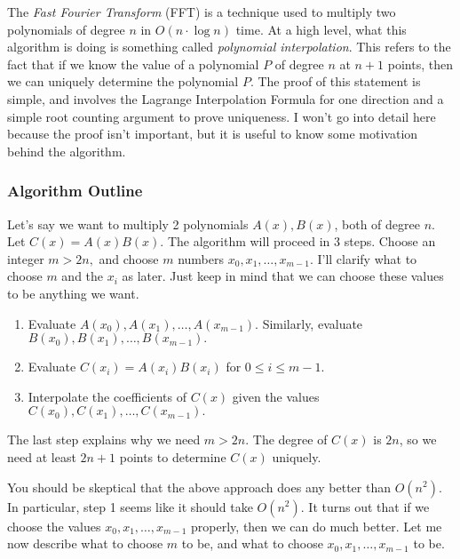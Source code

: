 The \emph{Fast Fourier Transform} (FFT) is a technique used to multiply two polynomials of degree $n$ in $O(n \cdot \log n)$ time. At a high level, what this algorithm is doing is something called \emph{polynomial interpolation}. This refers to the fact that if we know the value of a polynomial $P$ of degree $n$ at $n+1$ points, then we can uniquely determine the polynomial $P.$ The proof of this statement is simple, and involves the Lagrange Interpolation Formula for one direction and a simple root counting argument to prove uniqueness. I won't go into detail here because the proof isn't important, but it is useful to know some motivation behind the algorithm.

\subsubsection{Algorithm Outline}

Let's say we want to multiply 2 polynomials $A(x), B(x)$, both of degree $n$. Let $C(x) = A(x)B(x).$ The algorithm will proceed in 3 steps. Choose an integer $m > 2n,$ and choose $m$ numbers $x_0, x_1, \dots, x_{m-1}.$ I'll clarify what to choose $m$ and the $x_i$ as later. Just keep in mind that we can choose these values to be anything we want.

\begin{enumerate}

\item Evaluate $A(x_0), A(x_1), \dots, A(x_{m-1}).$ Similarly, evaluate $B(x_0), B(x_1), \dots, B(x_{m-1}).$

\item Evaluate $C(x_i) = A(x_i)B(x_i)$ for $0 \le i \le m-1.$

\item Interpolate the coefficients of $C(x)$ given the values $C(x_0), C(x_1), \dots, C(x_{m-1}).$

\end{enumerate}

The last step explains why we need $m > 2n.$ The degree of $C(x)$ is $2n$, so we need at least $2n+1$ points to determine $C(x)$ uniquely.

You should be skeptical that the above approach does any better than $O(n^2).$ In particular, step 1 seems like it should take $O(n^2).$ It turns out that if we choose the values $x_0, x_1, \dots, x_{m-1}$ properly, then we can do much better. Let me now describe what to choose $m$ to be, and what to choose $x_0, x_1, \dots, x_{m-1}$ to be.

